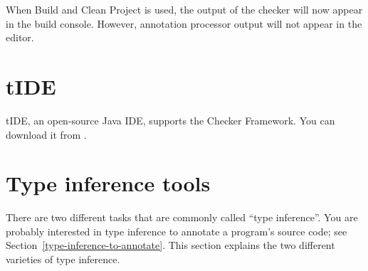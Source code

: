 \begin{enumerate}
When Build and Clean Project is used, the output of the checker will
now appear in the build console. However, annotation processor output
will not appear in the editor.

\end{enumerate}


\section{tIDE\label{tide}}

\begin{sloppypar}
tIDE, an open-source Java IDE, supports the Checker Framework.
You can download it from .
\end{sloppypar}


\section{Type inference tools\label{type-inference-varieties}}

There are two different tasks that are commonly called ``type inference''.
You are probably interested in type inference to annotate a program's
source code; see Section~\ref{type-inference-to-annotate}.  This section
explains the two different varieties of type inference.

